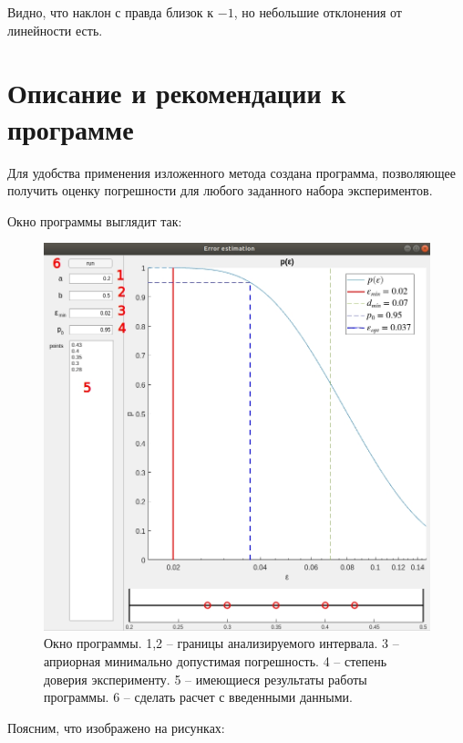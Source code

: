 \documentclass[a4paper,12pt]{article} %
\begin{document}
Видно, что наклон с правда близок к $-1$, но небольшие отклонения от линейности есть.

\newpage

\section{Описание и рекомендации к программе}

Для удобства применения изложенного метода создана программа, позволяющее получить оценку погрешности для любого заданного набора экспериментов.

Окно программы выглядит так:

\begin{figure}[h!]
\begin{center}
\includegraphics[width=1\textwidth]{./pics/whole_window_nums}
\end{center}
\caption{Окно программы. 1,2 -- границы анализируемого интервала. 3 -- априорная минимально допустимая погрешность. 4 -- степень доверия эксперименту. 5 -- имеющиеся результаты работы программы. 6 -- сделать расчет с введенными данными.} \label{img:whole_window}
\end{figure}

\newpage

Поясним, что изображено на рисунках:
\end{document}
